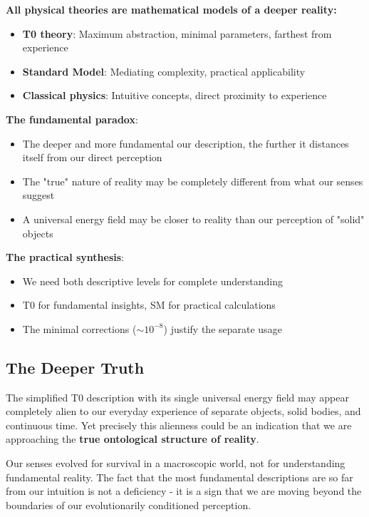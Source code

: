 	\begin{tcolorbox}[colback=purple!5!white,colframe=purple!75!black,title=Core Message]
		\textbf{All physical theories are mathematical models of a deeper reality:}
		
		\begin{itemize}
			\item \textbf{T0 theory}: Maximum abstraction, minimal parameters, farthest from experience
			\item \textbf{Standard Model}: Mediating complexity, practical applicability
			\item \textbf{Classical physics}: Intuitive concepts, direct proximity to experience
		\end{itemize}
		
		\textbf{The fundamental paradox}:
		\begin{itemize}
			\item The deeper and more fundamental our description, the further it distances itself from our direct perception
			\item The "true" nature of reality may be completely different from what our senses suggest
			\item A universal energy field may be closer to reality than our perception of "solid" objects
		\end{itemize}
		
		\textbf{The practical synthesis}:
		\begin{itemize}
			\item We need both descriptive levels for complete understanding
			\item T0 for fundamental insights, SM for practical calculations
			\item The minimal corrections ($\sim 10^{-8}$) justify the separate usage
		\end{itemize}
	\end{tcolorbox}
	
	\subsection{The Deeper Truth}
	
	The simplified T0 description with its single universal energy field may appear completely alien to our everyday experience of separate objects, solid bodies, and continuous time. Yet precisely this alienness could be an indication that we are approaching the \textbf{true ontological structure of reality}.
	
	Our senses evolved for survival in a macroscopic world, not for understanding fundamental reality. The fact that the most fundamental descriptions are so far from our intuition is not a deficiency - it is a sign that we are moving beyond the boundaries of our evolutionarily conditioned perception.
	
	
	